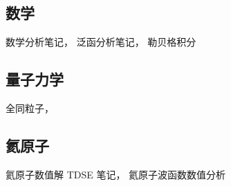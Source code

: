 
\subsection{数学}
数学分析笔记， 泛函分析笔记， 勒贝格积分

\subsection{量子力学}
全同粒子， 

\subsection{氦原子}
氦原子数值解 TDSE 笔记， 氦原子波函数数值分析
